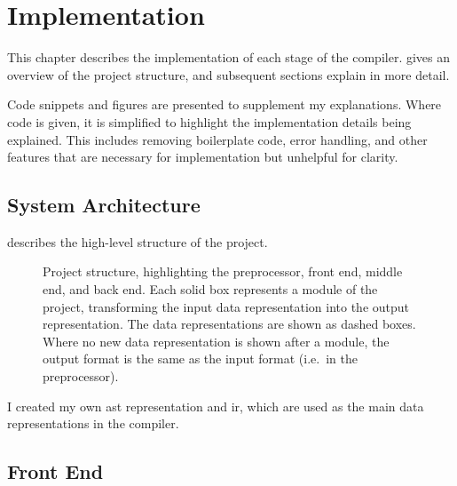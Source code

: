 \documentclass[00-main.tex]{subfiles}
\begin{document}
\chapter{Implementation}

This chapter describes the implementation of each stage of the compiler.
 gives an overview of the project structure, and subsequent sections explain in more detail.

Code snippets and figures are presented to supplement my explanations.
Where code is given, it is simplified to highlight the implementation details being explained.
This includes removing boilerplate code, error handling, and other features that are necessary for implementation but unhelpful for clarity.

\section{System Architecture}\label{sec:impl:system architecture}

 describes the high-level structure of the project.

\begin{figure}[!t]
  \centering
  \caption{Project structure, highlighting the preprocessor, front end, middle end, and back end. Each solid box represents a module of the project, transforming the input data representation into the output representation. The data representations are shown as dashed boxes. Where no new data representation is shown after a module, the output format is the same as the input format (i.e.~in the preprocessor).}
  \label{fig:project flowchart} %
\end{figure}

I created my own \gls{ast} representation and \gls{ir}, which are used as the main data representations in the compiler.


\section{Front End}

\end{document}

